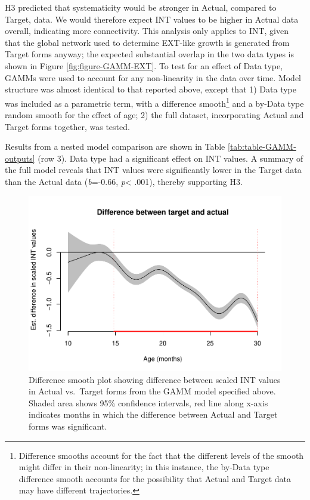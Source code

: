\documentclass[
  man]{apa6}
\begin{document}
H3 predicted that systematicity would be stronger in Actual, compared to Target, data. We would therefore expect INT values to be higher in Actual data overall, indicating more connectivity. This analysis only applies to INT, given that the global network used to determine EXT-like growth is generated from Target forms anyway; the expected substantial overlap in the two data types is shown in Figure \ref{fig:figure-GAMM-EXT}. To test for an effect of Data type, GAMMs were used to account for any non-linearity in the data over time. Model structure was almost identical to that reported above, except that 1) Data type was included as a parametric term, with a difference smooth\footnote{Difference smooths account for the fact that the different levels of the smooth might differ in their non-linearity; in this instance, the by-Data type difference smooth accounts for the possibility that Actual and Target data may have different trajectories.} and a by-Data type random smooth for the effect of age; 2) the full dataset, incorporating Actual and Target forms together, was tested.

Results from a nested model comparison are shown in Table \ref{tab:table-GAMM-outputs} (row 3). Data type had a significant effect on INT values. A summary of the full model reveals that INT values were significantly lower in the Target data than the Actual data (\emph{b}=-0.66, \emph{p}\textless{} .001), thereby supporting H3.

\begin{figure}
\centering
\includegraphics{PhonNetworksProj-accepted_files/figure-latex/difference-smooth-data-type-1.pdf}
\caption{\label{fig:difference-smooth-data-type}Difference smooth plot showing difference between scaled INT values in Actual vs.~Target forms from the GAMM model specified above. Shaded area shows 95\% confidence intervals, red line along x-axis indicates months in which
the difference between Actual and Target forms was significant.}
\end{figure}
\end{document}
